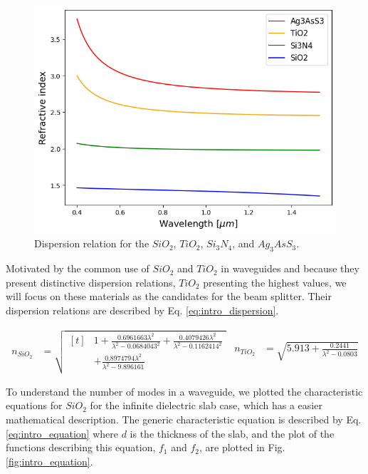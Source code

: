 \documentclass[conference, a4paper]{IEEEtran}
\begin{document}
\begin{figure}[H]
    \centering
    \includegraphics[scale=0.4]{dispersion_relation.png}
    \caption{Dispersion relation for the $SiO_2$, $TiO_2$, $Si_3N_4$, and $Ag_3AsS_3$.}
    \label{fig:intro_dispersion}
\end{figure}

Motivated by the common use of $SiO_2$ and $TiO_2$ in waveguides and because they present distinctive dispersion relations, $TiO_2$ presenting the highest values, we will focus on these materials as the candidates for the beam splitter. Their dispersion relations are described by Eq. \eqref{eq:intro_dispersion}.

\begin{subequations}
    \begin{align}
        n_{SiO_2} &= 
        \sqrt{\begin{aligned}[t]
            &1 + \frac{0.6961663 \lambda^2}{\lambda^2 - 0.0684043^2} 
            + \frac{0.4079426 \lambda^2}{\lambda^2 - 0.1162414^2} \\
            &+ \frac{0.8974794 \lambda^2}{\lambda^2 - 9.896161}
        \end{aligned}}
    \end{align}
    \begin{align}
        n_{TiO_2} &= \sqrt{5.913 + \frac{0.2441}{\lambda^2 - 0.0803}}
    \end{align}
    \label{eq:intro_dispersion}
\end{subequations}

To understand the number of modes in a waveguide, we plotted the characteristic equations for $SiO_2$ for the infinite dielectric slab case, which has a easier mathematical description. The generic characteristic equation is described by Eq. \eqref{eq:intro_equation} where $d$ is the thickness of the slab, and the plot of the functions describing this equation, $f_1$ and $f_2$, are plotted in Fig. \ref{fig:intro_equation}.
\end{document}
